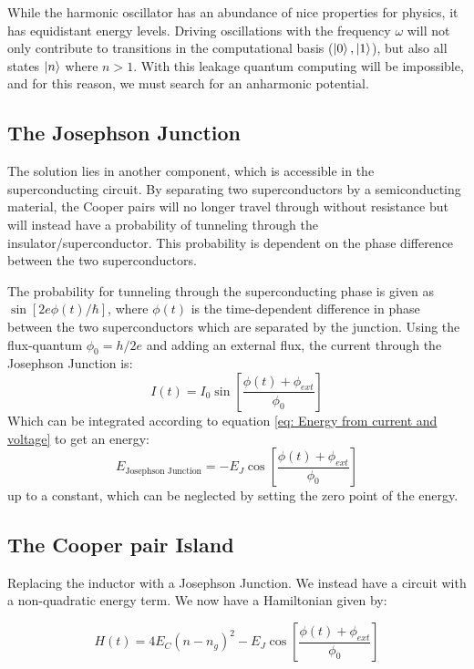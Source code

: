 While the harmonic oscillator has an abundance of nice properties for physics, it has equidistant energy levels. Driving oscillations with the frequency $\omega$ will not only contribute to transitions in the computational basis ($\ket{0}, \ket{1}$), but also all states $\ket{n}$ where $n > 1$. With this leakage quantum computing will be impossible, and for this reason, we must search for an anharmonic potential.

\subsection{The Josephson Junction}
The solution lies in another component, which is accessible in the superconducting circuit. By separating two superconductors by a semiconducting material, the Cooper pairs will no longer travel through without resistance but will instead have a probability of tunneling through the insulator/superconductor. This probability is dependent on the phase difference between the two superconductors. 

The probability for tunneling through the superconducting phase is given as $\sin[2e\phi(t) / \hbar]$, where $\phi(t)$ is the time-dependent difference in phase between the two superconductors which are separated by the junction. Using the flux-quantum $\phi_0 = h / 2e$ and adding an external flux, the current through the Josephson Junction is:
\begin{equation}
    I(t) = I_0 \sin \left[ \frac{\phi(t) + \phi_{ext}}{\phi_0} \right]
\end{equation}
Which can be integrated according to equation \ref{eq: Energy from current and voltage} to get an energy:
\begin{equation}
    E_{\text{Josephson Junction}} = - E_J \cos \left[ \frac{\phi(t) + \phi_{ext}}{\phi_0} \right]
\end{equation}
up to a constant, which can be neglected by setting the zero point of the energy. \cite{vool_introduction_2017}

\subsection{The Cooper pair Island}
Replacing the inductor with a Josephson Junction. We instead have a circuit with a non-quadratic energy term. We now have a Hamiltonian given by:

\begin{equation}
    H(t) =  4 E_C (n - n_g)^2 -  E_J \cos \left[ \frac{\phi(t) + \phi_{ext}}{\phi_0} \right]
\end{equation}

